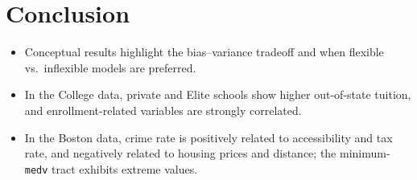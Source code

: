 \documentclass{article}
\begin{document}
\section{Conclusion}
\begin{itemize}
  \item Conceptual results highlight the bias--variance tradeoff and when flexible vs.\ inflexible models are preferred.
  \item In the College data, private and Elite schools show higher out-of-state tuition, and enrollment-related
  variables are strongly correlated.
  \item In the Boston data, crime rate is positively related to accessibility and tax rate, and negatively
  related to housing prices and distance; the minimum-\texttt{medv} tract exhibits extreme values.
\end{itemize}
\end{document}
